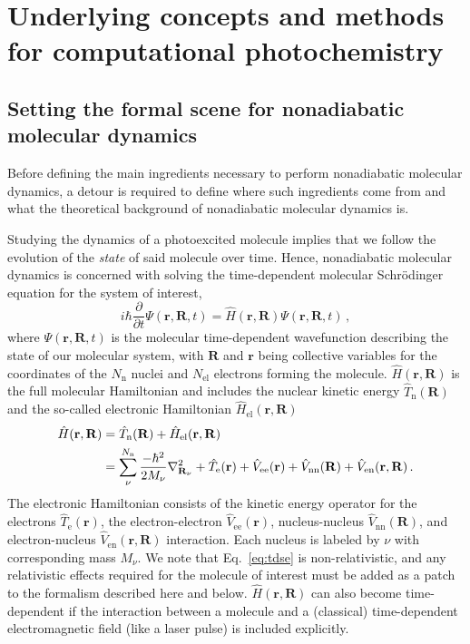 \documentclass[9pt,bestpractices,pubversion]{livecoms}
\begin{document}
\section{Underlying concepts and methods for computational photochemistry}
\subsection{Setting the formal scene for nonadiabatic molecular dynamics}
\label{setting-the-scene}

Before defining the main ingredients necessary to perform nonadiabatic molecular dynamics, a detour is required to define where such ingredients come from and what the theoretical background of nonadiabatic molecular dynamics is.

Studying the dynamics of a photoexcited molecule implies that we follow the evolution of the \textit{state} of said molecule over time. Hence, nonadiabatic molecular dynamics is concerned with solving the time-dependent molecular Schr\"{o}dinger equation for the system of interest,
\begin{equation}
i\hbar  \frac{\partial}{\partial t} \Psi(\mathbf{r},\mathbf{R},t)=\hat{H}(\mathbf{r},\mathbf{R})\Psi(\mathbf{r},\mathbf{R},t) \, ,
\label{eq:tdse}
\end{equation}
where $\Psi(\mathbf{r},\mathbf{R},t)$ is the molecular time-dependent wavefunction describing the state of our molecular system, with $\mathbf{R}$ and $\mathbf{r}$ being collective variables for the coordinates of the $N_\text{n}$ nuclei and $N_{\text{el}}$ electrons forming the molecule. $\hat{H}(\mathbf{r},\mathbf{R})$ is the full molecular Hamiltonian and includes the nuclear kinetic energy $\hat{T}_{\text{n}}(\mathbf{R})$ and the so-called electronic Hamiltonian $\hat{H}_{\text{el}}(\mathbf{r},\mathbf{R})$
\begin{align}
\hat{H}(\mathbf{r},\mathbf{R})&=\hat{T}_{\text{n}}(\mathbf{R})+ \hat{H}_{\text{el}}(\mathbf{r},\mathbf{R})  \notag \\
&= \sum_\nu^{N_{\text{n}}}\frac{-\hbar^2}{2M_\nu}\nabla_{\mathbf{R}_\nu}^2+\hat{T}_{\text{e}}(\mathbf{r})+\hat{V}_{\text{ee}}(\mathbf{r})+\hat{V}_{\text{nn}}(\mathbf{R})+\hat{V}_{\text{en}}(\mathbf{r},\mathbf{R})  \, .
\label{eq:fullHamiltonian}
\end{align}
The electronic Hamiltonian consists of the kinetic energy operator for the electrons $\hat{T}_{\text{e}}(\mathbf{r})$, the electron-electron $\hat{V}_{\text{ee}}(\mathbf{r})$, nucleus-nucleus $\hat{V}_{\text{nn}}(\mathbf{R})$, and electron-nucleus $\hat{V}_{\text{en}}(\mathbf{r},\mathbf{R})$ interaction. Each nucleus is labeled by $\nu$ with corresponding mass $M_\nu$. We note that Eq.~\eqref{eq:tdse} is non-relativistic, and any relativistic effects required for the molecule of interest must be added as a patch to the formalism described here and below. $\hat{H}(\mathbf{r},\mathbf{R})$ can also become time-dependent if the interaction between a molecule and a (classical) time-dependent electromagnetic field (like a laser pulse) is included explicitly.\cite{tannor_book} 
 
\end{document}
